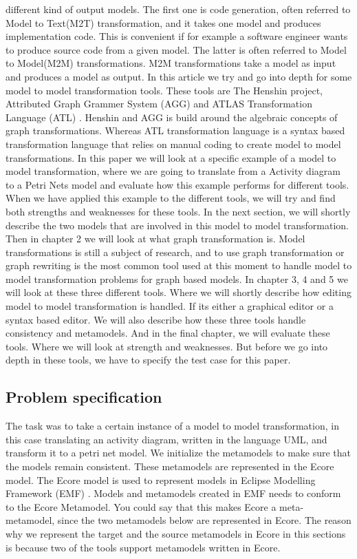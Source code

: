 \documentclass[pdftex,11pt,a4paper]{article}
\begin{document}
different kind of output models. The first one is code generation, often
referred to Model to Text(M2T) transformation, and it takes one model and
produces implementation code. This is convenient if for example a software
engineer wants to produce source code from a given model. The latter is often
referred to Model to Model(M2M) transformations. M2M transformations take a
model as input and produces a model as output. In this article we try and go
into depth for some model to model transformation tools. These tools are
The Henshin project\cite{Henshin}, Attributed Graph Grammer System (AGG)
\cite{AGG} and ATLAS Transformation Language (ATL) \cite{ATL}. Henshin and AGG
is build around the algebraic concepts of graph transformations. Whereas ATL
transformation language is a syntax based transformation language that relies
on manual coding to create model to model transformations. In this paper we
will look at a specific example of a model to model transformation, where we
are going to translate from a Activity diagram to a Petri Nets model and
evaluate how this example performs for different tools. When we have applied
this example to the different tools, we will try and find both strengths and
weaknesses for these tools. In the next section, we will shortly describe the
two models that are involved in this model to model transformation. Then in
chapter 2 we will look at what graph transformation is. Model transformations
is still a subject of research, and to use graph transformation or graph
rewriting is the most common tool used at this moment to handle model to model
transformation problems for graph based models. In chapter 3, 4 and 5 we will
look at these three different tools. Where we will shortly describe how editing
model to model transformation is handled. If its either a graphical editor or a
syntax based editor. We will also describe how these three tools handle
consistency and metamodels. And in the final chapter, we will evaluate these
tools. Where we will look at strength and weaknesses. But before we go into
depth in these tools, we have to specify the test case for this paper.

\subsection{Problem specification}
\noindent The task was to take a certain instance of a model to model
transformation, in this case translating an activity diagram, written in the
language UML, and transform it to a petri net model. We initialize the
metamodels to make sure that the models remain consistent. These metamodels are
represented in the Ecore model\cite{Steinberg2009}. The Ecore model is used to
represent models in Eclipse Modelling Framework (EMF) \cite{Steinberg2009}.
Models and metamodels created in EMF needs to conform to the Ecore Metamodel.
You could say that this makes Ecore a meta-metamodel, since the two metamodels
below are represented in Ecore. The reason why we represent the target and the
source metamodels in Ecore in this sections is because two of the tools support
metamodels written in Ecore.
\end{document}
